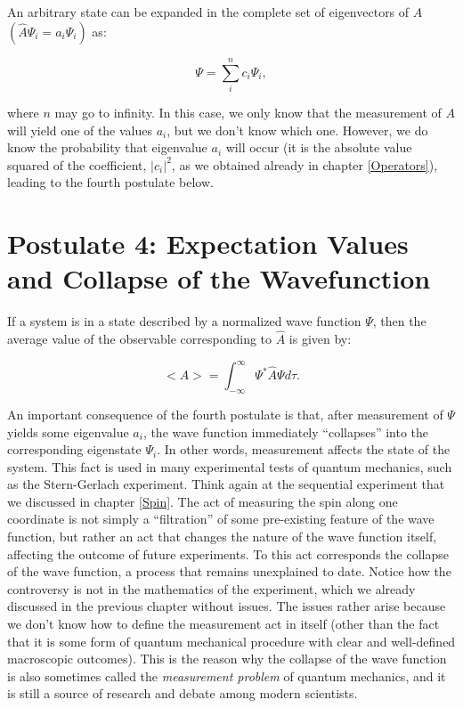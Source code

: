 \documentclass[
  9pt,
]{extbook}
\theoremstyle{definition}
\theoremstyle{definition}
\theoremstyle{definition}
\theoremstyle{remark}
\begin{document}
An arbitrary state can be expanded in the complete set of eigenvectors of \(\hat{A}\) \(\left(\hat{A}\Psi_i = a_i \Psi_i\right)\) as:

\begin{equation}
\Psi = \sum_i^{n} c_i \Psi_i,
\label{eq:post3}  
\end{equation}

where \(n\) may go to infinity. In this case, we only know that the measurement of \(A\) will yield one of the values \(a_i\), but we don't know which one. However, we do know the probability that eigenvalue \(a_i\) will occur (it is the absolute value squared of the coefficient, \(\vert c_i\vert^2\), as we obtained already in chapter \ref{Operators}), leading to the fourth postulate below.

\hypertarget{postulate-4-expectation-values-and-collapse-of-the-wavefunction}{%
\section{Postulate 4: Expectation Values and Collapse of the Wavefunction}\label{postulate-4-expectation-values-and-collapse-of-the-wavefunction}}

If a system is in a state described by a normalized wave function \(\Psi\), then the average value of the observable corresponding to \(\hat{A}\) is given by:

\begin{equation}
<A> = \int_{-\infty}^{\infty} \Psi^{*} \hat{A} \Psi d\tau.
\label{eq:post4}  
\end{equation}

An important consequence of the fourth postulate is that, after measurement of \(\Psi\) yields some eigenvalue \(a_i\), the wave function immediately ``collapses'' into the corresponding eigenstate \(\Psi_i\). In other words, measurement affects the state of the system. This fact is used in many experimental tests of quantum mechanics, such as the Stern-Gerlach experiment. Think again at the sequential experiment that we discussed in chapter \ref{Spin}. The act of measuring the spin along one coordinate is not simply a ``filtration'' of some pre-existing feature of the wave function, but rather an act that changes the nature of the wave function itself, affecting the outcome of future experiments. To this act corresponds the collapse of the wave function, a process that remains unexplained to date. Notice how the controversy is not in the mathematics of the experiment, which we already discussed in the previous chapter without issues. The issues rather arise because we don't know how to define the measurement act in itself (other than the fact that it is some form of quantum mechanical procedure with clear and well-defined macroscopic outcomes). This is the reason why the collapse of the wave function is also sometimes called the \emph{measurement problem} of quantum mechanics, and it is still a source of research and debate among modern scientists.
\end{document}
